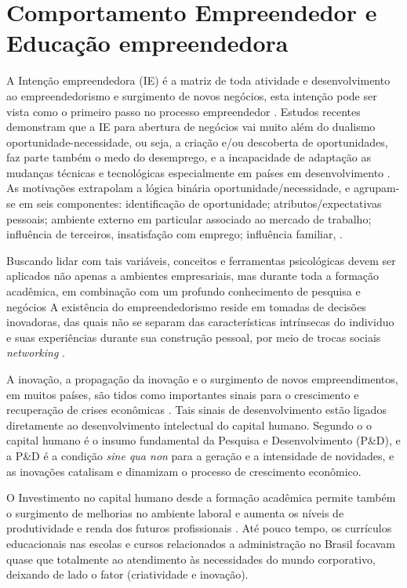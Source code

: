 \section{Comportamento Empreendedor e Educação empreendedora}


A Intenção empreendedora (IE) é a matriz de toda atividade e desenvolvimento ao empreendedorismo e surgimento de novos negócios, esta intenção pode ser vista como o primeiro passo no processo empreendedor \cite{zhao_relationship_2010, shirokova_exploring_2016}. Estudos recentes demonstram que a IE para abertura de negócios vai muito além do dualismo oportunidade-necessidade, ou seja, a criação e/ou descoberta de oportunidades, faz parte também o medo do desemprego, e a  incapacidade de adaptação as mudanças técnicas e tecnológicas especialmente em países em desenvolvimento \cite{vale_motivacoes_2014}. As motivações extrapolam a lógica binária oportunidade/necessidade, e agrupam-se em seis componentes: identificação  de  oportunidade;  atributos/expectativas pessoais; ambiente  externo em particular associado ao mercado de trabalho; influência  de  terceiros, insatisfação com emprego; influência familiar, \cite{vale_motivacoes_2014, rodrigues_intencao_2019,ferreira_intencao_2017}.

Buscando lidar com tais variáveis, conceitos e ferramentas psicológicas devem ser aplicados não apenas a ambientes empresariais, mas durante toda a formação acadêmica, em combinação com um profundo conhecimento de pesquisa e negócios \cite{zhao_relationship_2010} A existência do empreendedorismo reside em tomadas de decisões inovadoras, das quais não se separam das características intrínsecas do individuo e suas experiências durante sua construção pessoal, por meio de trocas sociais \textit{networking} \cite{de_souza_alencar_intencao_2019}.

A inovação, a propagação da inovação e o surgimento de novos empreendimentos, em muitos países, são tidos como importantes sinais para o crescimento e recuperação de crises econômicas \cite{silva_mudancestrutural_2017}. Tais sinais de desenvolvimento estão ligados diretamente ao desenvolvimento intelectual do capital humano. Segundo o  o capital humano é o insumo fundamental da Pesquisa e Desenvolvimento (P\&D), e a P\&D é a condição \textit{sine qua non} para a geração e a intensidade de novidades, e as inovações catalisam e dinamizam o processo de crescimento econômico.

O Investimento no  capital  humano desde a formação acadêmica permite também o surgimento de melhorias no ambiente laboral e aumenta os níveis de produtividade e renda dos futuros profissionais \cite{macedo_capital_2019}. Até pouco tempo, os currículos educacionais nas escolas e cursos relacionados a administração no Brasil focavam quase que totalmente ao atendimento às necessidades do mundo corporativo, deixando de lado o fator (criatividade e inovação). 

